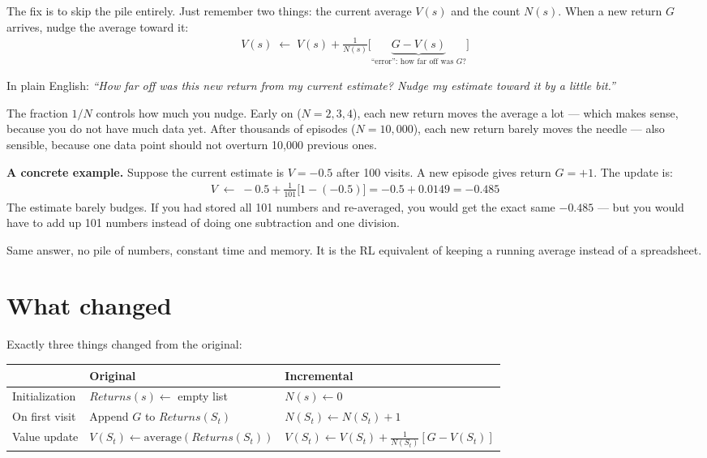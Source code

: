 \documentclass[11pt]{article}
\begin{document}
The fix is to skip the pile entirely. Just remember two things: the current average $V(s)$ and the count $N(s)$. When a new return $G$ arrives, nudge the average toward it:
\begin{align}
    V(s) \;\leftarrow\; V(s) + \frac{1}{N(s)}\Big[\underbrace{G - V(s)}_{\text{``error'': how far off was } G\text{?}}\Big]
\end{align}

In plain English: \textit{``How far off was this new return from my current estimate? Nudge my estimate toward it by a little bit.''}

The fraction $1/N$ controls how much you nudge. Early on ($N = 2, 3, 4$), each new return moves the average a lot --- which makes sense, because you do not have much data yet. After thousands of episodes ($N = 10{,}000$), each new return barely moves the needle --- also sensible, because one data point should not overturn 10{,}000 previous ones.

\textbf{A concrete example.} Suppose the current estimate is $V = -0.5$ after 100 visits. A new episode gives return $G = +1$. The update is:
\begin{align}
    V \;\leftarrow\; -0.5 + \frac{1}{101}\big[1 - (-0.5)\big] = -0.5 + 0.0149 = -0.485
\end{align}
The estimate barely budges. If you had stored all 101 numbers and re-averaged, you would get the exact same $-0.485$ --- but you would have to add up 101 numbers instead of doing one subtraction and one division.

Same answer, no pile of numbers, constant time and memory. It is the RL equivalent of keeping a running average instead of a spreadsheet.

\section*{What changed}

Exactly three things changed from the original:

\begin{table}[H]
    \centering
    \begin{tabular}{lll}
        \toprule
        & \textbf{Original} & \textbf{Incremental} \\
        \midrule
        Initialization & $Returns(s) \leftarrow$ empty list & $N(s) \leftarrow 0$ \\
        \addlinespace
        On first visit & Append $G$ to $Returns(S_t)$ & $N(S_t) \leftarrow N(S_t) + 1$ \\
        \addlinespace
        Value update & $V(S_t) \leftarrow \text{average}(Returns(S_t))$ & $V(S_t) \leftarrow V(S_t) + \frac{1}{N(S_t)}[G - V(S_t)]$ \\
        \bottomrule
    \end{tabular}
\end{table}
\end{document}
